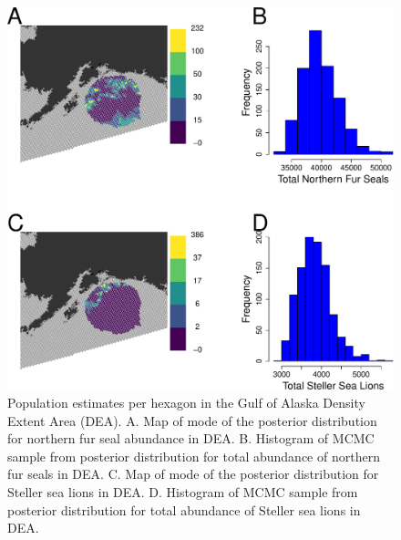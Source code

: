 \documentclass[11pt, titlepage]{article}
\begin{document}
\begin{spacing}{1.9}
\begin{flushleft}
\begin{figure}[H]
  \begin{center}
  \includegraphics[width=.9\linewidth]{Fig-GOAabu}
  \end{center}
  \caption{Population estimates per hexagon in the Gulf of Alaska Density Extent Area (DEA). A. Map of mode of the posterior distribution for northern fur seal abundance in DEA. B. Histogram of MCMC sample from posterior distribution for total abundance of northern fur seals in DEA. C. Map of mode of the posterior distribution for Steller sea lions in DEA. D. Histogram of MCMC sample from posterior distribution for total abundance of Steller sea lions in DEA. \label{Fig-GOAabu}}         
\end{figure} 


\end{flushleft}
\end{spacing}
\end{document}

